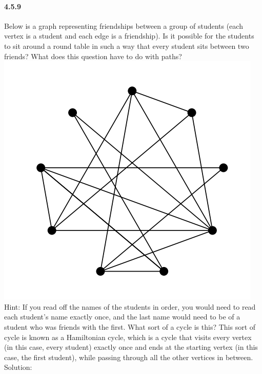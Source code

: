 \documentclass{article}
\begin{document}
\paragraph{4.5.9}
Below is a graph representing friendships between a group of students
(each vertex is a student and each edge is a friendship). Is it possible
for the students to sit around a round table in such a way that every
student sits between two friends? What does this question have to do
with paths?\newline
\includegraphics{0078}\newline
Hint:\newline
If you read off the names of the students in order, you would need
to read each student’s name exactly once, and the last name would need to
be of a student who was friends with the first. What sort of a cycle is this?\newline
This sort of cycle is known as a Hamiltonian cycle, which is a cycle that visits every vertex (in this case, every student) exactly once and ends at the starting vertex (in this case, the first student), while passing through all the other vertices in between.\newline
Solution:\newline
\end{document}
